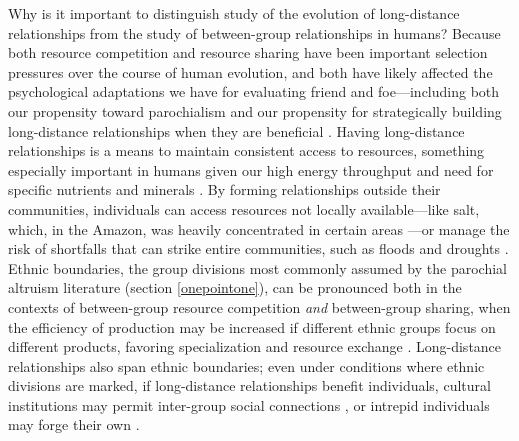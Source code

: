 \documentclass[bibauthoryear]{aa}
\begin{document}
Why is it important to distinguish study of the evolution of long-distance relationships from the study of between-group relationships in humans? Because both resource competition and resource sharing have been important selection pressures over the course of human evolution, and both have likely affected the psychological adaptations we have for evaluating friend and foe---including both our propensity toward parochialism \citep{moya2015different} and our propensity for strategically building long-distance relationships when they are beneficial \citep{pisor2019evolution, pisorjones2020}. Having long-distance relationships is a means to maintain consistent access to resources, something especially important in humans given our high energy throughput and need for specific nutrients and minerals \citep{pisor2019evolution}. By forming relationships outside their communities, individuals can access resources not locally available---like salt, which, in the Amazon, was heavily concentrated in certain areas \citep{reeve1993regional}---or manage the risk of shortfalls that can strike entire communities, such as floods and droughts \citep{pisor2019evolution, pisorjones2020}. Ethnic boundaries, the group divisions most commonly assumed by the parochial altruism literature (section \ref{onepointone}), can be pronounced both in the contexts of between-group resource competition \citep{choi2007coevolution, bellmoya} \textit{and} between-group sharing, when the efficiency of production may be increased if different ethnic groups focus on different products, favoring specialization and resource exchange \citep{barth1956ecologic, brewer1976ethnocentrism, moya2015different}. Long-distance relationships also span ethnic boundaries; even under conditions where ethnic divisions are marked, if long-distance relationships benefit individuals, cultural institutions may permit inter-group social connections \citep{bollig2010risk}, or intrepid individuals may forge their own \citep{pisor2019evolution, schaub2017threat}.\\
\indent
\end{document}
